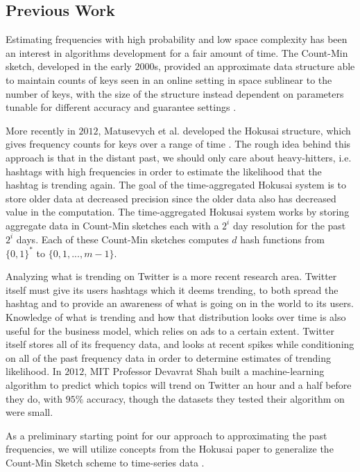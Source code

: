 \documentclass[twoside]{article}
\newcommand{\cc}[1]
 {\textbf{\cite{#1}}}
\begin{document}
{\subsection{Previous Work} \label{sec:PreviousWork}

Estimating frequencies with high probability and low space complexity has been an interest in
algorithms development for a fair amount of time. The Count-Min sketch, developed in the early $2000$s,
provided an approximate data structure able to maintain counts of keys seen in an online setting in space sublinear to the number of keys, with the size of the structure instead dependent on parameters tunable for different accuracy and guarantee settings \cc{Cormode:2005}.

More recently in $2012$, Matusevych et al. developed the Hokusai structure, which gives frequency counts for keys over a range of time \cc{Matusevych:2012}. The rough idea behind this approach is that in the distant past, we should only care about heavy-hitters, i.e. hashtags with high frequencies in order to estimate the likelihood that the hashtag is trending again. The goal of the time-aggregated Hokusai system is to store older data at decreased precision since the older data also has decreased value in the computation.  The time-aggregated Hokusai system works by storing aggregate data in Count-Min sketches each with a $2^i$ day resolution for the past $2^i$ days.  Each of these Count-Min sketches computes $d$ hash functions from $\{0,1\}^*$ to $\{0, 1, ..., m-1\}$.


Analyzing what is trending on Twitter is a more recent research area. Twitter itself must give its users hashtags which it deems trending, to both spread the hashtag and to provide an awareness of what is going on in the world to its users. Knowledge of what is trending and how that distribution looks over time is also useful for the business model, which relies on ads to a certain extent.
Twitter itself stores all of its frequency data, and looks at recent spikes while conditioning on all of the past frequency data in order to determine estimates of trending likelihood.
In $2012$, MIT Professor Devavrat Shah built a machine-learning algorithm to predict which topics will trend on Twitter an hour and a half before they do, with $95\%$ accuracy, though the datasets they tested their algorithm on were small\cc{MITNews2012}. 

As a preliminary starting point for our approach to approximating the past frequencies, we will utilize concepts from the Hokusai paper to generalize the Count-Min Sketch scheme to time-series data \cc{Matusevych:2012}. 

}
\end{document}
